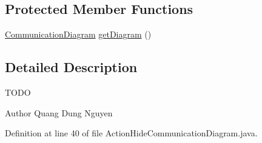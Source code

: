 \subsection*{Protected Member Functions}
\begin{DoxyCompactItemize}
\item 
\hyperlink{classorg_1_1tzi_1_1use_1_1gui_1_1views_1_1diagrams_1_1behavior_1_1communicationdiagram_1_1_communication_diagram}{Communication\-Diagram} \hyperlink{classorg_1_1tzi_1_1use_1_1gui_1_1views_1_1diagrams_1_1event_1_1_action_hide_communication_diagram_a8c0e2ed7ad23ef7802001f0b85a65ceb}{get\-Diagram} ()
\end{DoxyCompactItemize}


\subsection{Detailed Description}
T\-O\-D\-O \begin{DoxyAuthor}{Author}
Quang Dung Nguyen 
\end{DoxyAuthor}


Definition at line 40 of file Action\-Hide\-Communication\-Diagram.\-java.



